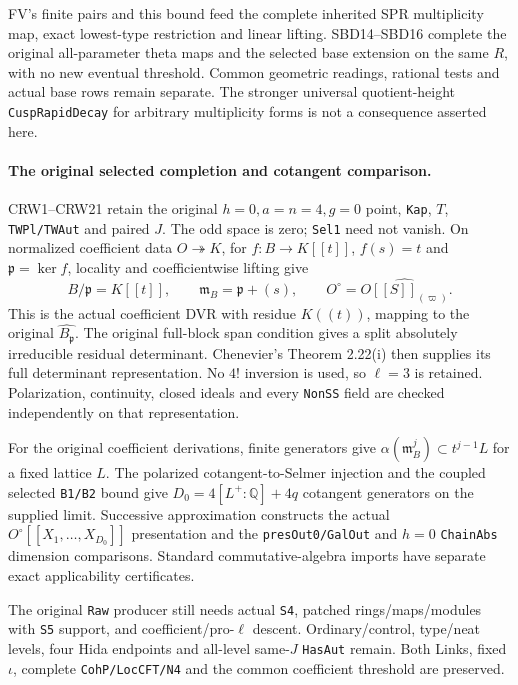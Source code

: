 FV's finite pairs and this bound feed the complete inherited
SPR multiplicity map, exact lowest-type restriction and linear
lifting. SBD14--SBD16 complete the original all-parameter theta
maps and the selected base extension on the same $R$, with no
new eventual threshold. Common geometric readings, rational
tests and actual base rows remain separate. The stronger
universal quotient-height \texttt{CuspRapidDecay} for arbitrary
multiplicity forms is not a consequence asserted here.

\paragraph{The original selected completion and cotangent comparison.}
CRW1--CRW21 retain the original $h=0,a=n=4,g=0$ point,
\texttt{Kap}, $T$, \texttt{TWPl/TWAut} and paired $J$.
The odd space is zero; \texttt{Sel1} need not vanish.
On normalized coefficient data $O\twoheadrightarrow K$,
for $f:B\to K[[t]]$, $f(s)=t$ and $\mathfrak p=\ker f$,
locality and coefficientwise lifting give
\[
 B/\mathfrak p=K[[t]],\qquad
 \mathfrak m_B=\mathfrak p+(s),\qquad
 O^\circ=\widehat{O[[S]]_{(\varpi)}}.
\]
This is the actual coefficient DVR with residue $K((t))$,
mapping to the original $\widehat{B_{\mathfrak p}}$.
The original full-block span condition gives a split absolutely
irreducible residual determinant. Chenevier's Theorem 2.22(i)
then supplies its full determinant representation. No $4!$
inversion is used, so $\ell=3$ is retained. Polarization,
continuity, closed ideals and every \texttt{NonSS} field are
checked independently on that representation.

For the original coefficient derivations, finite generators
give $\alpha(\mathfrak m_B^j)\subset t^{j-1}L$ for a fixed
lattice $L$. The polarized cotangent-to-Selmer injection and
the coupled selected \texttt{B1/B2} bound give
$D_0=4[L^+:\mathbb Q]+4q$ cotangent generators on the supplied
limit. Successive approximation constructs the actual
$O^\circ[[X_1,\ldots,X_{D_0}]]$ presentation and the
\texttt{presOut0/GalOut} and $h=0$ \texttt{ChainAbs}
dimension comparisons. Standard commutative-algebra imports
have separate exact applicability certificates.

The original \texttt{Raw} producer still needs actual
\texttt{S4}, patched rings/maps/modules with \texttt{S5}
support, and coefficient/pro-$\ell$ descent. Ordinary/control,
type/neat levels, four Hida endpoints and all-level same-$J$
\texttt{HasAut} remain. Both Links, fixed $\iota$, complete
\texttt{CohP/LocCFT/N4} and the common coefficient threshold
are preserved.

